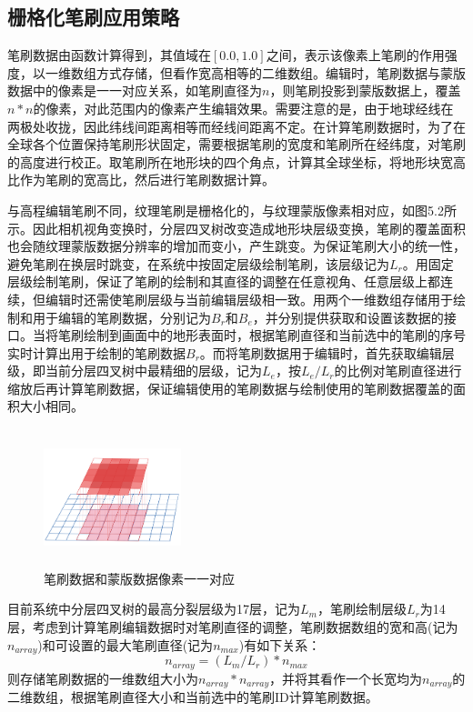 \subsection{栅格化笔刷应用策略}
笔刷数据由函数计算得到，其值域在$[0.0,1.0]$之间，表示该像素上笔刷的作用强度，以一维数组方式存储，但看作宽高相等的二维数组。编辑时，笔刷数据与蒙版数据中的像素是一一对应关系，如笔刷直径为$n$，则笔刷投影到蒙版数据上，覆盖$n*n$的像素，对此范围内的像素产生编辑效果。需要注意的是，由于地球经线在两极处收拢，因此纬线间距离相等而经线间距离不定。在计算笔刷数据时，为了在全球各个位置保持笔刷形状固定，需要根据笔刷的宽度和笔刷所在经纬度，对笔刷的高度进行校正。取笔刷所在地形块的四个角点，计算其全球坐标，将地形块宽高比作为笔刷的宽高比，然后进行笔刷数据计算。\par

与高程编辑笔刷不同，纹理笔刷是栅格化的，与纹理蒙版像素相对应，如图5.2所示。因此相机视角变换时，分层四叉树改变造成地形块层级变换，笔刷的覆盖面积也会随纹理蒙版数据分辨率的增加而变小，产生跳变。为保证笔刷大小的统一性，避免笔刷在换层时跳变，在系统中按固定层级绘制笔刷，该层级记为$L_r$。用固定层级绘制笔刷，保证了笔刷的绘制和其直径的调整在任意视角、任意层级上都连续，但编辑时还需使笔刷层级与当前编辑层级相一致。用两个一维数组存储用于绘制和用于编辑的笔刷数据，分别记为$B_r$和$B_e$，并分别提供获取和设置该数据的接口。当将笔刷绘制到画面中的地形表面时，根据笔刷直径和当前选中的笔刷的序号实时计算出用于绘制的笔刷数据$B_r$。而将笔刷数据用于编辑时，首先获取编辑层级，即当前分层四叉树中最精细的层级，记为$L_e$，按$L_e/L_r$的比例对笔刷直径进行缩放后再计算笔刷数据，保证编辑使用的笔刷数据与绘制使用的笔刷数据覆盖的面积大小相同。\par
\begin{figure}[htb]
    \centering
    \includegraphics[height=4cm ,width=4cm]{figures/brush2.png}
  \caption{笔刷数据和蒙版数据像素一一对应}
  \end{figure}
目前系统中分层四叉树的最高分裂层级为17层，记为$L_m$，笔刷绘制层级$L_r$为14层，考虑到计算笔刷编辑数据时对笔刷直径的调整，笔刷数据数组的宽和高(记为$n_{array}$)和可设置的最大笔刷直径(记为$n_{max}$)有如下关系：
\begin{equation}
n_{array}=(L_m/L_r)*n_{max}
\end{equation}
则存储笔刷数据的一维数组大小为$n_{array}*n_{array}$，并将其看作一个长宽均为$n_{array}$的二维数组，根据笔刷直径大小和当前选中的笔刷ID计算笔刷数据。\par
